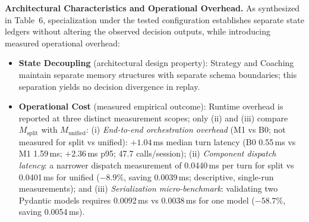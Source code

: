 \documentclass[runningheads]{llncs}
\begin{document}
\begin{table}[t]
\caption{Architectural and operational comparison of the Specialized Two-Agent Architecture ($M_{\mathrm{split}}$) versus a Unified Monolithic Controller ($M_{\mathrm{unified}}$).}
\label{tab:splitunified}
\centering
{}
\end{table}

\textbf{Architectural Characteristics and Operational Overhead.} As synthesized in Table~6, specialization under the tested configuration establishes separate state ledgers without altering the observed decision outputs, while introducing measured operational overhead:
\begin{itemize}
\item \textbf{State Decoupling} (architectural design property): Strategy and Coaching maintain separate memory structures with separate schema boundaries; this separation yields no decision divergence in replay.
\item \textbf{Operational Cost} (measured empirical outcome): Runtime overhead is reported at three distinct measurement scopes; only (ii) and (iii) compare $M_{\mathrm{split}}$ with $M_{\mathrm{unified}}$: (i) \emph{End-to-end orchestration overhead} (M1 vs B0; not measured for split vs unified): $+1.04$\,ms median turn latency (B0 0.55\,ms vs M1 1.59\,ms; $+2.36$\,ms p95; 47.7 calls/session); (ii) \emph{Component dispatch latency}: a narrower dispatch measurement of 0.0440\,ms per turn for split vs 0.0401\,ms for unified ($-8.9\%$, saving 0.0039\,ms; descriptive, single-run measurements); and (iii) \emph{Serialization micro-benchmark}: validating two Pydantic models requires 0.0092\,ms vs 0.0038\,ms for one model ($-58.7\%$, saving 0.0054\,ms).
\end{itemize}
\end{document}
